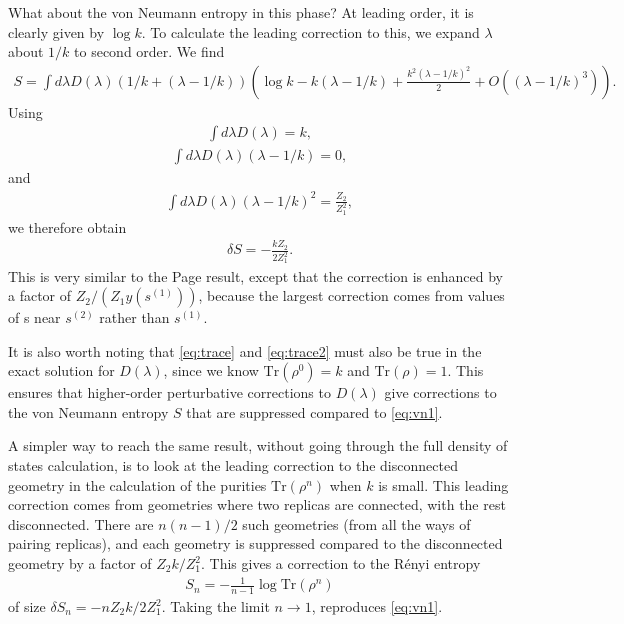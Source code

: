 \documentclass[11pt]{article}
\numberwithin{equation}{section}
\begin{document}
What about the von Neumann entropy in this phase? At leading order, it is clearly given by $\log k$. To calculate the leading correction to this, we expand $\lambda$ about $1/k$ to second order. We find
\begin{align} \label{eq:vonNeumannsemicircle}
S = \int d \lambda D(\lambda) (1/k + (\lambda - 1/k)) \left( \log k - k (\lambda - 1/k)  + \frac{k^2 (\lambda - 1/k)^2}{2} + O((\lambda - 1/k)^3)\right).
\end{align}
Using
\begin{align} \label{eq:trace}
\int d \lambda D(\lambda) = k,
\end{align}
\begin{align} \label{eq:trace2}
\int d \lambda D(\lambda) (\lambda  - 1/k)= 0,
\end{align}
and
\begin{align} \label{eq:2ndmoment}
\int d \lambda D(\lambda) (\lambda -1/k)^2 = \frac{Z_2 }{ Z_1^2},
\end{align}
we therefore obtain
\begin{align} \label{eq:vn1}
\delta S = - \frac{k Z_2}{2 Z_1^2}.
\end{align}
This is very similar to the Page result, except that the correction is enhanced by a factor of $Z_2 / (Z_1 y(s^{(1)}))$, because the largest correction comes from values of s near $s^{(2)}$ rather than $s^{(1)}$. 

It is also worth noting that \eqref{eq:trace} and \eqref{eq:trace2} must also be true in the exact solution for $D(\lambda)$, since we know $\mathrm{Tr}(\rho^0) = k$ and  $\mathrm{Tr}(\rho) = 1$. This ensures that higher-order perturbative corrections to $D(\lambda)$ give corrections to the von Neumann entropy $S$ that are suppressed compared to \eqref{eq:vn1}.

A simpler way to reach the same result, without going through the full density of states calculation, is to look at the leading correction to the disconnected geometry in the calculation of the purities $\mathrm{Tr}(\rho^n)$ when $k$ is small. This leading correction comes from geometries where two replicas are connected, with the rest disconnected. There are $n(n-1)/2$ such geometries (from all the ways of pairing replicas), and each geometry is suppressed compared to the disconnected geometry by a factor of $Z_2 k / Z_1^2$. This gives a correction to the R\'{e}nyi entropy 
\begin{align}
S_n = -\frac{1}{n-1} \log \mathrm{Tr}(\rho^n)
\end{align}
of size $\delta S_n = -n Z_2 k / 2 Z_1^2$. Taking the limit $n \to 1$, reproduces \eqref{eq:vn1}.
\end{document}
